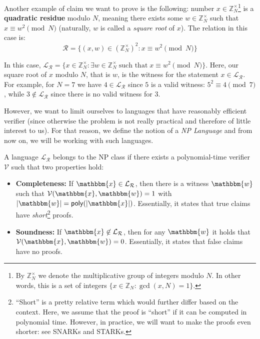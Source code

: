 \documentclass[../../book.tex]{subfiles}
\begin{document}
\begin{example}
    Another example of claim we want to prove is the following: number $x \in \mathbb{Z}_N^{\times}$\footnote{By $\mathbb{Z}_N^{\times}$ we denote the multiplicative group of integers modulo $N$. In other words, this is a set of integers $\{x \in \mathbb{Z}_N: \gcd(x, N) = 1\}$.} is a \textbf{quadratic residue} modulo $N$, meaning there exists some $w \in \mathbb{Z}_N^{\times}$ such that $x \equiv w^2 \pmod{N}$ (naturally, $w$ is called a \textit{square root} of $x$). The relation in this case is:
    \begin{equation*}
        \mathcal{R} = \{ (x, w) \in (\mathbb{Z}_N^{\times})^2: x \equiv w^2 \pmod{N} \}
    \end{equation*}

    In this case, $\mathcal{L}_{\mathcal{R}} = \{x \in \mathbb{Z}_N^{\times}: \exists w \in \mathbb{Z}_N^{\times} \; \text{such that} \; x \equiv w^2 \pmod{N}\}$. Here, our square root of $x$ modulo $N$, that is $w$, is the witness for the statement $x \in \mathcal{L}_{\mathcal{R}}$. For example, for $N=7$ we have $4 \in \mathcal{L}_{\mathcal{R}}$ since $5$ is a valid witness: $5^2 \equiv 4 \pmod{7}$, while $3 \not\in \mathcal{L}_{\mathcal{R}}$ since there is no valid witness for $3$.
\end{example}

However, we want to limit ourselves to languages that have reasonably efficient
verifier (since otherwise the problem is not really practical and therefore of
little interest to us). For that reason, we define the notion of a \emph{NP
Language} and from now on, we will be working with such languages.

\begin{definition}[NP Language]
    A language $\mathcal{L}_{\mathcal{R}}$ belongs to the NP class if there
    exists a polynomial-time verifier $\mathcal{V}$ such that two properties
    hold:
    \begin{itemize}
        \item \textbf{Completeness:} If $\mathbbm{x} \in
        \mathcal{L}_{\mathcal{R}}$, then there is a witness $\mathbbm{w}$ such
        that $\mathcal{V}(\mathbbm{x}, \mathbbm{w}) = 1$ with $|\mathbbm{w}| =
        \mathsf{poly}(|\mathbbm{x}|)$. Essentially, it states that true claims
        have \textit{short}\footnote{``Short'' is a pretty relative term which
        would further differ based on the context. Here, we assume that the
        proof is ``short'' if it can be computed in polynomial time. However, in
        practice, we will want to make the proofs even shorter: see SNARKs and
        STARKs.} proofs.
        \item \textbf{Soundness:} If $\mathbbm{x} \not\in
        \mathcal{L}_{\mathcal{R}}$, then for any $\mathbbm{w}$ it holds that
        $\mathcal{V}(\mathbbm{x}, \mathbbm{w}) = 0$. Essentially, it states that
        false claims have no proofs.
    \end{itemize}
\end{definition}
\end{document}
